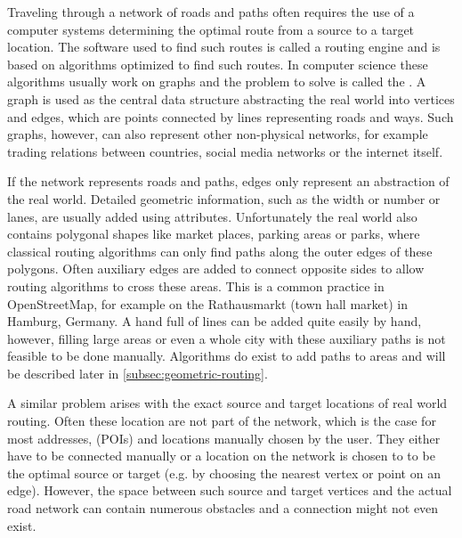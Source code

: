 
Traveling through a network of roads and paths often requires the use of a computer systems determining the optimal route from a source to a target location.
The software used to find such routes is called a routing engine and is based on algorithms optimized to find such routes.
In computer science these algorithms usually work on graphs and the problem to solve is called the .
A graph is used as the central data structure abstracting the real world into vertices and edges, which are points connected by lines representing roads and ways.
Such graphs, however, can also represent other non-physical networks, for example trading relations between countries, social media networks or the internet itself.

If the network represents roads and paths, edges only represent an abstraction of the real world.
Detailed geometric information, such as the width or number or lanes, are usually added using attributes.
Unfortunately the real world also contains polygonal shapes like market places, parking areas or parks, where classical routing algorithms can only find paths along the outer edges of these polygons.
Often auxiliary edges are added to connect opposite sides to allow routing algorithms to cross these areas.
This is a common practice in OpenStreetMap, for example on the Rathausmarkt (town hall market) in Hamburg, Germany.
A hand full of lines can be added quite easily by hand, however, filling large areas or even a whole city with these auxiliary paths is not feasible to be done manually.
Algorithms do exist to add paths to areas and will be described later in \cref{subsec:geometric-routing}.

A similar problem arises with the exact source and target locations of real world routing.
Often these location are not part of the network, which is the case for most addresses,  (POIs) and locations manually chosen by the user.
They either have to be connected manually or a location on the network is chosen to to be the optimal source or target (e.g. by choosing the nearest vertex or point on an edge).
However, the space between such source and target vertices and the actual road network can contain numerous obstacles and a connection might not even exist.

